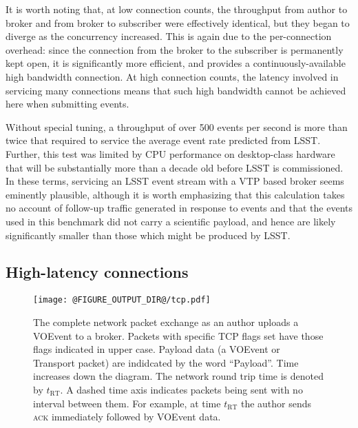 \documentclass[5p,authoryear]{elsarticle}
\begin{document}
It is worth noting that, at low connection counts, the throughput from author
to broker and from broker to subscriber were effectively identical, but they
began to diverge as the concurrency increased. This is again due to the
per-connection overhead: since the connection from the broker to the
subscriber is permanently kept open, it is significantly more efficient, and
provides a continuously-available high bandwidth connection. At high
connection counts, the latency involved in servicing many connections means
that such high bandwidth cannot be achieved here when submitting events.

Without special tuning, a throughput of over 500 events per second is more
than twice that required to service the average event rate predicted from
LSST. Further, this test was limited by CPU performance on desktop-class
hardware that will be substantially more than a decade old before LSST is
commissioned. In these terms, servicing an LSST event stream with a VTP based
broker seems eminently plausible, although it is worth emphasizing that this
calculation takes no account of follow-up traffic generated in response to
events and that the events used in this benchmark did not carry a scientific
payload, and hence are likely significantly smaller than those which might be
produced by LSST.

\subsection{High-latency connections}
\label{sec:perf:highlatency}

\begin{figure}
  \begin{center}
  \texttt{[image: @FIGURE\_OUTPUT\_DIR@/tcp.pdf]}
  \end{center}

  \caption{The complete network packet exchange as an author uploads a VOEvent
  to a broker. Packets with specific TCP flags set have those flags indicated
  in upper case. Payload data (a VOEvent or Transport packet) are indidcated
  by the word ``Payload''. Time increases down the diagram. The network round
  trip time is denoted by $t_\mathrm{RT}$. A dashed time axis indicates
  packets being sent with no interval between them. For example, at time
  $t_\mathrm{RT}$ the author sends \textsc{ack} immediately followed by
  VOEvent data.}

  \label{fig:tcp}
\end{figure}
\end{document}
